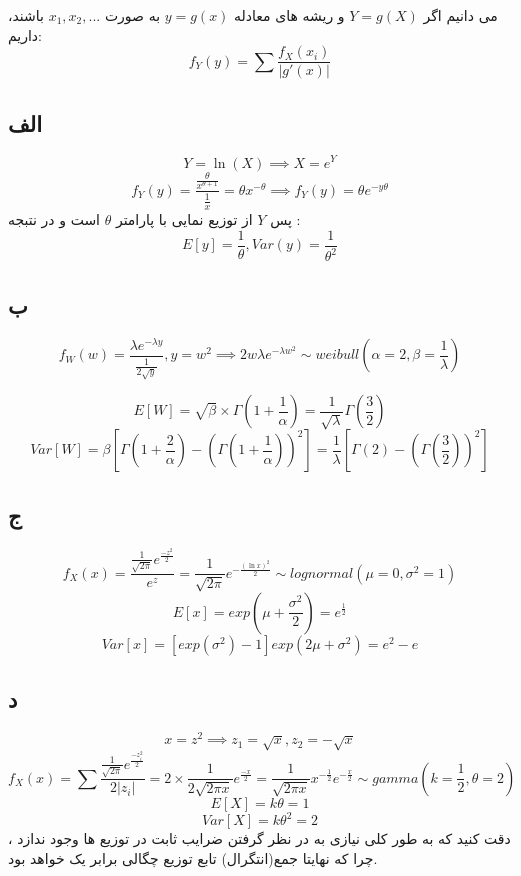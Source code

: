 

می دانیم اگر $Y = g(X)$  و ریشه های معادله $y = g(x)$ به صورت $x_1 , x_2, ...$ باشند، داریم:
$$f_{Y}(y) = \sum \frac{f_{X}(x_{i})}{|g'(x)|}$$

\subsection*{الف}
$$Y = \ln(X) \implies X = e^{Y}$$
$$f_{Y}(y) = \frac{\frac{\theta}{x^{\theta + 1}}}{\frac{1}{x}} = \theta x^{-\theta} \implies f_{Y}(y) = \theta e ^ {-y\theta}$$
پس $Y$ از توزیع نمایی با پارامتر $\theta$ است و در نتبجه :
$$ E[y] = \frac{1}{\theta}, Var(y) = \frac{1}{\theta ^ 2} $$
\subsection*{ب}
$$f_{W}(w) = \frac{\lambda e^{-\lambda y}}{\frac{1}{2 \sqrt{y}}}, y = w^{2} \implies 2w\lambda e^{-\lambda w^{2}} \sim weibull(\alpha = 2 , \beta = \frac{1}{\lambda})$$

$$E[W] = \sqrt{\beta} \times \Gamma (1 + \frac{1}{\alpha}) = \frac{1}{\sqrt{\lambda}}\Gamma (\frac{3}{2})$$
$$Var[W] = \beta[\Gamma(1 + \frac{2}{\alpha}) - (\Gamma(1 + \frac{1}{\alpha})) ^ {2}] = \frac{1}{\lambda}[\Gamma(2) - (\Gamma(\frac{3}{2})) ^ {2}]$$
\subsection*{ج}
$$f_{X}(x) = \frac{\frac{1}{\sqrt{2\pi}}e^{\frac{-z^2}{2}}}{e^{z}} = \frac{1}{\sqrt{2\pi}}e^{-\frac{(\ln x) ^ 2}{2}} \sim lognormal(\mu = 0, \sigma ^ 2 = 1)$$
$$E[x] = exp(\mu + \frac{\sigma ^ 2}{2}) = e ^ {\frac{1}{2}}$$
$$Var[x] = [exp(\sigma ^ 2) - 1]exp(2\mu + \sigma ^ 2) = e^2 - e$$
\subsection*{د}
$$x = z ^ 2 \implies z_{1} = \sqrt{x}, z_{2} = -\sqrt{x}$$
$$f_{X}(x) = \sum \frac{\frac{1}{\sqrt{2\pi}}e ^ {\frac{-z_{i} ^ 2}{2}}}{2|z_{i}|} = 2 \times \frac{1}{2\sqrt{2\pi x}}e ^ {\frac{-x}{2}} = \frac{1}{\sqrt{2 \pi x}}x ^ {-\frac{1}{2}}e ^ {-\frac{x}{2}} \sim gamma(k = \frac{1}{2} , \theta = 2)$$
$$E[X] = k\theta  = 1$$
$$Var[X] = k\theta ^ 2 = 2$$
دقت کنید که به طور کلی نیازی به در نظر گرفتن ضرایب ثابت در توزیع ها وجود ندازد ، چرا که نهایتا جمع(انتگرال) تابع توزیع چگالی برابر یک خواهد بود.
